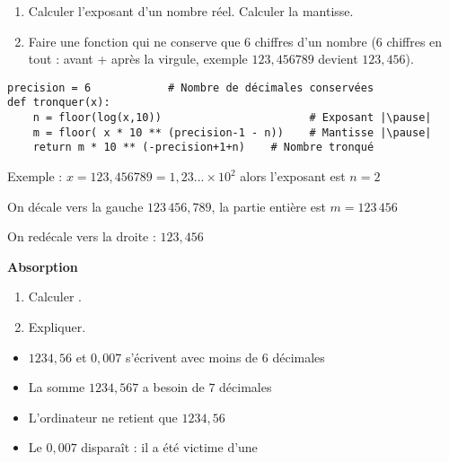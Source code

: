 \begin{frame}[fragile]

\begin{tp}
\begin{enumerate}
  \item Calculer l'exposant d'un nombre réel. Calculer la mantisse.
  \item Faire une fonction qui ne conserve que $6$ chiffres d'un nombre 
  ($6$ chiffres en tout : avant + après la virgule, exemple
  $123,456789$ devient $123,456$).
\end{enumerate}  
\end{tp}

\pause

\begin{algo}[reels.py (1)]
\begin{lstlisting}
precision = 6            # Nombre de décimales conservées
def tronquer(x):
    n = floor(log(x,10))                       # Exposant |\pause|
    m = floor( x * 10 ** (precision-1 - n))    # Mantisse |\pause|
    return m * 10 ** (-precision+1+n)    # Nombre tronqué
\end{lstlisting}  
\end{algo}

\pause

Exemple : $x = 123,456789 = 1,23... \times 10^2$ alors l'exposant est $n=2$

On décale vers la gauche $123\, 456,789$,
la partie entière  est $m=123\, 456$

On redécale vers la droite : $123,456$


\end{frame}


\begin{frame}

\hfill\hfill\textbf{Absorption}

\begin{tp}
\begin{enumerate}
  \item Calculer .
  \item Expliquer.
\end{enumerate}  
\end{tp}

\pause
\bigskip

\begin{itemize}
  \item $1234,56$ et $0,007$ s'écrivent avec moins de $6$ décimales
\pause
  \item La somme $1234,567$ a besoin de $7$ décimales
\pause
  \item L'ordinateur ne retient que $1234,56$
\pause
  \item Le $0,007$ disparaît : il a été victime d'une 
\end{itemize}

\end{frame}

